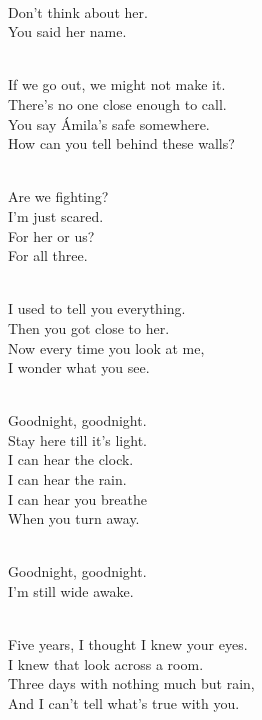 \begin{lyrics}

\\
Don’t think about her.
\\
You said her name.

\\
If we go out, we might not make it.\\
There’s no one close enough to call.\\
You say Ámila’s safe somewhere.\\
How can you tell behind these walls?

\\
Are we fighting?
\\
I’m just scared.
\\
For her or us?
\\
For all three.

\\
I used to tell you everything.\\
Then you got close to her.\\
Now every time you look at me,\\
I wonder what you see.

\\
Goodnight, goodnight.\\
Stay here till it’s light.\\
I can hear the clock.\\
I can hear the rain.
\\
I can hear you breathe\\
When you turn away.

\\
Goodnight, goodnight.
\\
I’m still wide awake.


\\
Five years, I thought I knew your eyes.\\
I knew that look across a room.\\
Three days with nothing much but rain,\\
And I can’t tell what’s true with you.


\end{lyrics}
